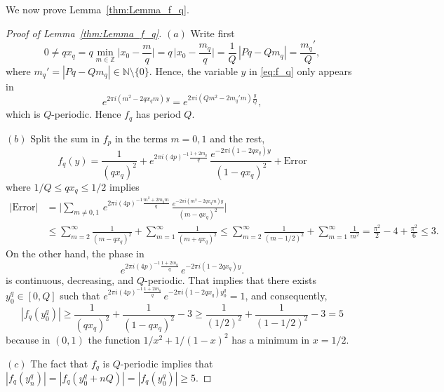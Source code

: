 \documentclass[11pt,reqno]{amsart}
\theoremstyle{definition}
\begin{document}
We now prove Lemma~\ref{thm:Lemma_f_q}. 
\begin{proof}[Proof of Lemma~\ref{thm:Lemma_f_q}]
$(a)$ Write first 
\begin{equation}
0 \neq qx_q 
= q \min_{m \in \mathbb Z} \Big|x_0 - \frac{m}{q} \Big|
= q \,  \Big|x_0 - \frac{m_q}{q} \Big|
= \frac{1}{Q} \,  | Pq - Q m_q | 
= \frac{m_q'}{Q},
\end{equation}
where $m_q' = |Pq - Qm_q| \in \mathbb N \setminus \{0\}$. 
Hence, the variable $y$ in \eqref{eq:f_q} only appears in  
\begin{equation}
e^{2\pi i (m^2 - 2qx_q m) \, y } = e^{2\pi i (Qm^2 - 2 m_q' m) \frac{y}{Q} }, 
\end{equation}
which is $Q$-periodic. Hence $f_q$ has period $Q$. 

$(b)$ Split the sum in $f_p$ in the terms $m=0,1$ and the rest,  
\begin{equation}
f_q(y) 
=   \frac{1}{ (qx_q)^2} 
+ e^{2\pi i (4p)^{-1} \frac{ 1 + 2m_q }{q}} \,  \frac{e^{- 2\pi i (1  - 2 qx_q)  y }}{ (1 - qx_q)^2}
+ \text{Error}
\end{equation}
where $1/Q \leq qx_q \leq 1/2$ implies
\begin{equation}
\begin{split}
|\text{Error}| 
& = \Big| \sum_{m \neq 0,1} \, e^{2\pi i (4p)^{-1} \frac{ m^2 + 2m_q m}{q}} \,  
\frac{e^{- 2\pi i (m^2  - 2 qx_q m)  y }}{ (m - qx_q)^2} \Big|  \\
& \leq  \sum_{m=2}^\infty \frac{1}{ (m - qx_q)^2} +  \sum_{m=1}^\infty \frac{1}{ (m + qx_q)^2} 
\leq \sum_{m=2}^\infty \frac{1}{ (m - 1/2)^2} +  \sum_{m=1}^\infty \frac{1}{ m^2} 
= \frac{\pi^2}{2} - 4 + \frac{\pi^2}{6} \leq 3. 
\end{split}
\end{equation}
On the other hand, the phase in 
\begin{equation}
e^{2\pi i (4p)^{-1} \frac{ 1 + 2m_q }{q}} \, e^{- 2\pi i (1  - 2 qx_q)  y }.
\end{equation}
is continuous, decreasing, and $Q$-periodic. 
That implies that there exists $y_0^q \in [0,Q]$ such that  
$e^{2\pi i (4p)^{-1} \frac{ 1 + 2m_q }{q}} \, e^{- 2\pi i (1  - 2 qx_q)  y_0^q } = 1$, 
and consequently, 
\begin{equation}
|f_q(y_0^q)| \geq \frac{1}{ (qx_q)^2} +  \frac{1}{ (1 - qx_q)^2} - 3 \geq \frac{1}{ (1/2)^2} +  \frac{1}{ (1 - 1/2)^2} - 3 = 5
\end{equation} 
because in $(0,1)$ the function $1/x^2 + 1/(1-x)^2$ has a minimum in $x=1/2$. 

$(c)$ The fact that $f_q$ is $Q$-periodic implies that 
$|f_q(y_n^q)| = |f_q(y_0^q + nQ)| =  |f_q(y_0^q )| \geq 5$. 
\end{proof}
\end{document}
